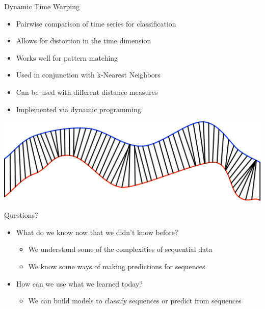 \documentclass[aspectratio=169]{beamer}
\begin{document}
\begin{frame}{Dynamic Time Warping}

\begin{itemize}
\item Pairwise comparison of time series for classification
\item Allows for distortion in the time dimension
\item Works well for pattern matching
\item Used in conjunction with k-Nearest Neighbors
\item Can be used with different distance measures
\item Implemented via dynamic programming
\end{itemize}
\includegraphics[width=1\textwidth]{lectSeq/dtw.pdf}

\end{frame}
\begin{frame}{Questions?}
\begin{itemize}
	\item What do we know now that we didn't know before?
\begin{itemize}
	\item We understand some of the complexities of sequential data
	\item We know some ways of making predictions for sequences
\end{itemize}

	\item How can we use what we learned today?
\begin{itemize}
	\item We can build models to classify sequences or predict from sequences
\end{itemize}
\end{itemize}
\end{frame}
\end{document}
